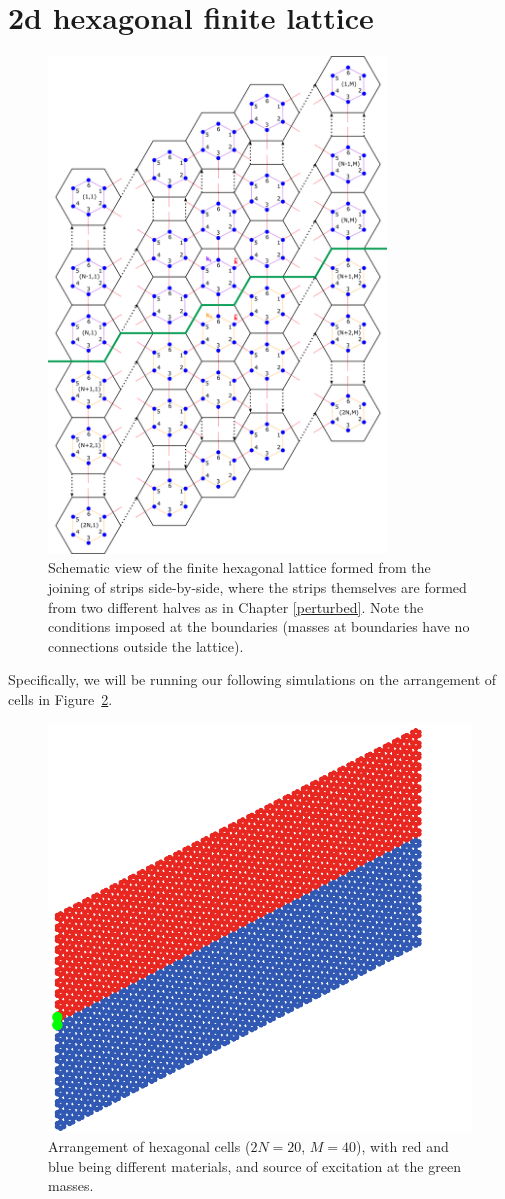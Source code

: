 \section{2d hexagonal finite lattice}
\begin{figure}[!h]
\centering
\includegraphics[width=0.8\textwidth]{imgs/hexfinitemodel.png}
\caption{\label{fig:hexfinscheme} Schematic view of the finite hexagonal
  lattice formed from the joining of strips side-by-side, where the strips
  themselves are formed from two different halves as in Chapter
  \ref{perturbed}. Note the conditions imposed at the boundaries (masses at
  boundaries have no connections outside the lattice).}
\end{figure}

Specifically, we will be running our following simulations on the arrangement
of cells in Figure~\ref{fig:hexstdfinlattice}.

\begin{figure}
  \centering
  \includegraphics[width=0.5\linewidth]{imgs/hexstdfinlattice.png}
  \caption{Arrangement of hexagonal cells ($2N=20$, $M=40$), with red and blue
    being different materials, and source of excitation at the green masses.}
  \label{fig:hexstdfinlattice}
\end{figure}

